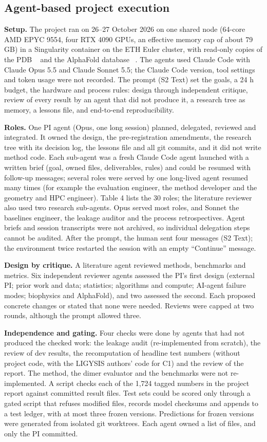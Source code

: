 \documentclass[10pt,letterpaper]{article}
\begin{document}
\subsection*{Agent-based project execution}

\textbf{Setup.} The project ran on 26--27 October 2026 on one shared node (64-core AMD EPYC 9554, four RTX 4090 GPUs, an effective memory cap of about 79 GB) in a Singularity container on the ETH Euler cluster, with read-only copies of the PDB ~\cite{berman2000} and the AlphaFold database ~\cite{varadi2022}. The agents used Claude Code with Claude Opus 5.5 and Claude Sonnet 5.5; the Claude Code version, tool settings and token usage were not recorded. The prompt (S2 Text) set the goals, a 24 h budget, the hardware and process rules: design through independent critique, review of every result by an agent that did not produce it, a research tree as memory, a lessons file, and end-to-end reproducibility.

\textbf{Roles.} One PI agent (Opus, one long session) planned, delegated, reviewed and integrated. It owned the design, the pre-registration amendments, the research tree with its decision log, the lessons file and all git commits, and it did not write method code. Each sub-agent was a fresh Claude Code agent launched with a written brief (goal, owned files, deliverables, rules) and could be resumed with follow-up messages; several roles were served by one long-lived agent resumed many times (for example the evaluation engineer, the method developer and the geometry and HPC engineer). Table 4 lists the 30 roles; the literature reviewer also used two research sub-agents. Opus served most roles, and Sonnet the baselines engineer, the leakage auditor and the process retrospectives. Agent briefs and session transcripts were not archived, so individual delegation steps cannot be audited. After the prompt, the human sent four messages (S2 Text); the environment twice restarted the session with an empty ``Continue'' message.

\textbf{Design by critique.} A literature agent reviewed methods, benchmarks and metrics. Six independent reviewer agents assessed the PI's first design (external PI; prior work and data; statistics; algorithms and compute; AI-agent failure modes; biophysics and AlphaFold), and two assessed the second. Each proposed concrete changes or stated that none were needed. Reviews were capped at two rounds, although the prompt allowed three.

\textbf{Independence and gating.} Four checks were done by agents that had not produced the checked work: the leakage audit (re-implemented from scratch), the review of dev results, the recomputation of headline test numbers (without project code, with the LIGYSIS authors' code for C1) and the review of the report. The method, the dimer evaluator and the benchmarks were not re-implemented. A script checks each of the 1,724 tagged numbers in the project report against committed result files. Test sets could be scored only through a gated script that refuses modified files, records model checksums and appends to a test ledger, with at most three frozen versions. Predictions for frozen versions were generated from isolated git worktrees. Each agent owned a list of files, and only the PI committed.
\end{document}
